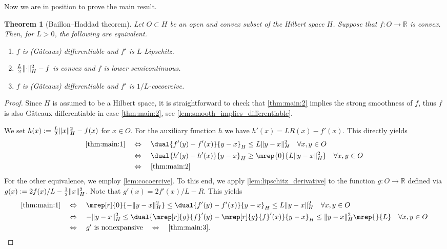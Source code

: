 \documentclass[
	english
]{scrartcl}
\numberwithin{equation}{section} %
\DeclarePairedDelimiter\norm{\lVert}{\rVert}
\newcommand\R{\mathbb{R}}
\newtheorem{theorem}{Theorem}[section]
\begin{document}
Now we are in position to prove the main result.
\begin{theorem}[Baillon--Haddad theorem]
	\label{thm:main}
	Let $O \subset H$ be an open and convex subset of the Hilbert space $H$.
	Suppose that $f \colon O \to \R$
	is convex.
	Then, for $L > 0$, the following are equivalent.
	\begin{enumerate}
		\item
			\label{thm:main:1}
			$f$ is (Gâteaux) differentiable
			and $f'$ is $L$-Lipschitz.
		\item
			\label{thm:main:2}
			$\frac L2 \norm{\cdot}_H^2 - f$ is convex
			and $f$ is lower semicontinuous.
		\item
			\label{thm:main:3}
			$f$ is (Gâteaux) differentiable
			and $f'$ is $1/L$-cocoercive.
	\end{enumerate}
\end{theorem}
\begin{proof}
	Since $H$ is assumed to be a Hilbert space,
	it is straightforward to check that
	\ref{thm:main:2}
	implies the strong smoothness of $f$,
	thus
	$f$ is also Gâteaux differentiable in case
	\ref{thm:main:2},
	see
	\cref{lem:smooth_implies_differentiable}.

	We set $h(x) := \frac L2 \norm{x}_H^2 - f(x)$ for $x \in O$.
	For the auxiliary function $h$
	we have $h'(x) = L R(x) - f'(x)$.
	This directly yields
	\begin{align*}
		\ref{thm:main:1}
		&\quad\Leftrightarrow\quad
		\dual{f'(y) - f'(x)}{y - x}_H \le L \norm{y - x}_H^2
		\quad\forall x,y \in O
		\\
		&\quad\Leftrightarrow\quad
		\dual{h'(y) - h'(x)}{y - x}_H \ge \mrep{0}{L \norm{y - x}_H^2}
		\quad\forall x,y \in O
		\\
		&\quad\Leftrightarrow\quad
		\ref{thm:main:2}
	\end{align*}
	For the other equivalence,
	we employ \cref{lem:cocoercive}.
	To this end, we apply \cref{lem:lipschitz_derivative}
	to the function $g \colon O \to \R$
	defined via $g(x) := 2 f(x) / L - \frac12 \norm{x}_H^2$.
	Note that $g'(x) = 2 f'(x) / L - R$.
	This yields
	\begin{align*}
		\ref{thm:main:1}
		&\quad\Leftrightarrow\quad
		\mrep[r]{0}{-\norm{y - x}_H^2} \le \dual{f'(y) - f'(x)}{y - x}_H \le L \norm{y - x}_H^2
		\quad\forall x,y \in O
		\\
		&\quad\Leftrightarrow\quad
		-\norm{y - x}_H^2 \le \dual{\mrep[r]{g}{f}'(y) - \mrep[r]{g}{f}'(x)}{y - x}_H \le \norm{y - x}_H^2\mrep{}{L}
		\quad\forall x,y \in O
		\\
		&\quad\Leftrightarrow\quad
		\text{$g'$ is nonexpansive}
		\quad\Leftrightarrow\quad
		\ref{thm:main:3}
		.
		\qedhere
	\end{align*}
\end{proof}
\end{document}
